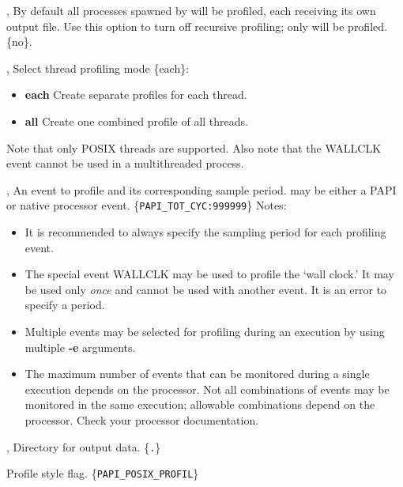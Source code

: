 \documentclass[english]{article}
\begin{document}
\begin{Description}
  \item[\OptoArg{-r}{yes \Bar no}, \OptoArg{--recursive}{yes \Bar no}] By default all processes spawned by  will be profiled, each receiving its own output file.  Use this option to turn off recursive profiling; only  will be profiled. \{no\}.
  \item[\OptArg{-t}{mode}, \OptArg{--threads}{mode}] Select thread profiling mode \{each\}:
  \begin{itemize}
    \item \textbf{each} Create separate profiles for each thread.
    \item \textbf{all} Create one combined profile of all threads.
  \end{itemize}
  Note that only POSIX threads are supported.
  Also note that the WALLCLK event cannot be used in a multithreaded process.
  \item[\OptArg{-e}{event\Lbr:period\Rbr}, \OptArg{--event}{event\Lbr:period\Rbr}]  An event to profile and its corresponding sample period.  may be either a PAPI or native processor event. \{\verb+PAPI_TOT_CYC:999999+\} Notes:
  \begin{itemize}
    \item It is recommended to always specify the sampling period for each profiling event.
    \item The special event WALLCLK may be used to profile the `wall clock.'  It may be used only \emph{once} and cannot be used with another event. It is an error to specify a period.
    \item Multiple events may be selected for profiling during an execution by using multiple \textbf{-e} arguments.
    \item The maximum number of events that can be monitored during a single execution depends on the processor. Not all combinations of events may be monitored in the same execution; allowable combinations depend on the processor. Check your processor documentation.
  \end{itemize}
  \item[\OptoArg{-o}{outpath}, \OptoArg{--output}{outpath}] Directory for output data.  \{\texttt{.}\}
  \item[\OptArg{--papi-flag}{flag}] Profile style flag.  \{\verb+PAPI_POSIX_PROFIL+\}
\end{Description}


\end{document}
